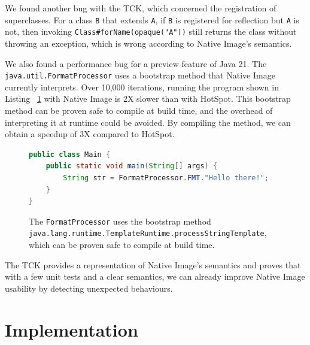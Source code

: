 We found another bug with the TCK, which concerned the registration of superclasses. For a class \verb|B| that extends \verb|A|, if \verb|B| is registered for reflection but \verb|A| is not, then invoking \verb|Class#forName(opaque("A"))| still returns the class without throwing an exception, which is wrong according to Native Image's semantics. 

We also found a performance bug for a preview feature of Java 21. The \verb|java.util.FormatProcessor| uses a bootstrap method that Native Image currently interprets. Over 10,000 iterations, running the program shown in Listing ~\ref{fig:format_processor} with Native Image is 2X slower than with HotSpot. This bootstrap method can be proven safe to compile at build time, and the overhead of interpreting it at runtime could be avoided. By compiling the method, we can obtain a speedup of 3X compared to HotSpot.

\begin{figure}[ht]
    \centering
\begin{lstlisting}[language=Java]
public class Main {
    public static void main(String[] args) {
        String str = FormatProcessor.FMT."Hello there!";
    }
}
\end{lstlisting}
    \caption{The \texttt{FormatProcessor} uses the bootstrap method \texttt{java.lang.runtime.TemplateRuntime.processStringTemplate}, which can be proven safe to compile at build time. }
    \label{fig:format_processor}
\end{figure}

The TCK provides a representation of Native Image's semantics and proves that with a few unit tests and a clear semantics, we can already improve Native Image usability by detecting unexpected behaviours.


\chapter{Implementation}

